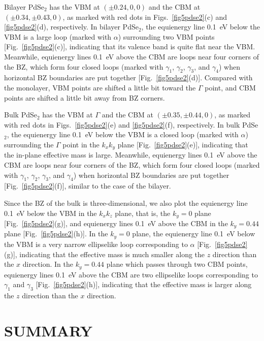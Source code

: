 \documentclass[aps,prb,longbibliography,twocolumn]{revtex4-2}
\begin{document}
Bilayer PdSe$_2$ has the VBM at $(\pm0.24,0,0)$ and the CBM 
at $(\pm0.34,\pm0.43,0)$, as marked with red dots
in Figs.~\ref{fig5pdse2}(c) and \ref{fig5pdse2}(d), respectively.
In bilayer PdSe$_2$, the equienergy line 0.1~eV below the VBM is a large 
loop (marked with $\alpha$)
surrounding two VBM points [Fig.~\ref{fig5pdse2}(c)], indicating that its valence band 
is quite flat near the VBM.
Meanwhile, equienergy lines 0.1~eV above the CBM are loops near four corners of the BZ,
which form four closed loops (marked with $\gamma_1$, $\gamma_2$, $\gamma_3$,
and $\gamma_4$) when horizontal BZ boundaries are put together 
[Fig.~\ref{fig5pdse2}(d)]. Compared with the monolayer, VBM points are shifted a little bit 
toward the $\Gamma$ point, and CBM points are shifted a little bit away from
BZ corners.


Bulk PdSe$_2$ has the VBM at $\Gamma$ and the CBM at $(\pm0.35,\pm0.44,0)$, 
as marked with red dots in Figs.~\ref{fig5pdse2}(e) and \ref{fig5pdse2}(f), respectively.
In bulk PdSe$_2$, the equienergy line 0.1~eV below the VBM is a closed loop (marked
with $\alpha$) surrounding the $\Gamma$ point in the $k_xk_y$ plane [Fig.~\ref{fig5pdse2}(e)], 
indicating that the in-plane effective mass is large.
Meanwhile, equienergy lines 0.1~eV above the CBM are loops near four corners of the
BZ, which form four closed loops (marked with $\gamma_1$, $\gamma_2$, $\gamma_3$,
and $\gamma_4$) when horizontal BZ boundaries are put together
[Fig.~\ref{fig5pdse2}(f)], similar to the case of the bilayer.


Since the BZ of the bulk is three-dimensional, we also plot the equienergy line
0.1~eV below the VBM in the $k_xk_z$ plane, that is, the $k_y = 0$ 
plane [Fig.~\ref{fig5pdse2}(g)], and equienergy lines 0.1~eV above the CBM in the $k_y = 0.44$ 
plane [Fig.~\ref{fig5pdse2}(h)]. In the $k_y = 0$ plane, the equienergy line 0.1~eV 
below the VBM is a very narrow ellipselike loop corresponding 
to $\alpha$ [Fig.~\ref{fig5pdse2}(g)], indicating that the effective mass is much 
smaller along the $z$ direction than the $x$ direction.
In the $k_y = 0.44$ plane which passes through two CBM points, equienergy 
lines 0.1~eV above the CBM are two ellipselike loops corresponding 
to $\gamma_1$ and $\gamma_3$ [Fig.~\ref{fig5pdse2}(h)], indicating that the 
effective mass is larger along the $z$ direction than the $x$ direction.


\section{\label{sec4pdse2}SUMMARY}
\end{document}
